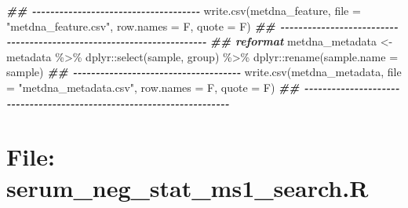 \documentclass[
]{article}
\newenvironment{Shaded}{\begin{snugshade}}{\end{snugshade}}
\newcommand{\AttributeTok}[1]{\textcolor[rgb]{0.77,0.63,0.00}{#1}}
\newcommand{\DocumentationTok}[1]{\textcolor[rgb]{0.56,0.35,0.01}{\textbf{\textit{#1}}}}
\newcommand{\FunctionTok}[1]{\textcolor[rgb]{0.00,0.00,0.00}{#1}}
\newcommand{\NormalTok}[1]{#1}
\newcommand{\OtherTok}[1]{\textcolor[rgb]{0.56,0.35,0.01}{#1}}
\newcommand{\SpecialCharTok}[1]{\textcolor[rgb]{0.00,0.00,0.00}{#1}}
\newcommand{\StringTok}[1]{\textcolor[rgb]{0.31,0.60,0.02}{#1}}
\begin{document}
\begin{Shaded}
\begin{Highlighting}[]
\DocumentationTok{\#\# {-}{-}{-}{-}{-}{-}{-}{-}{-}{-}{-}{-}{-}{-}{-}{-}{-}{-}{-}{-}{-}{-}{-}{-}{-}{-}{-}{-}{-}{-}{-}{-}{-}{-}{-}{-}{-} }
\FunctionTok{write.csv}\NormalTok{(metdna\_feature, }\AttributeTok{file =} \StringTok{"metdna\_feature.csv"}\NormalTok{, }\AttributeTok{row.names =}\NormalTok{ F, }\AttributeTok{quote =}\NormalTok{ F)}
\DocumentationTok{\#\# {-}{-}{-}{-}{-}{-}{-}{-}{-}{-}{-}{-}{-}{-}{-}{-}{-}{-}{-}{-}{-}{-}{-}{-}{-}{-}{-}{-}{-}{-}{-}{-}{-}{-}{-}{-}{-}{-}{-}{-}{-}{-}{-}{-}{-}{-}{-}{-}{-}{-}{-}{-}{-}{-}{-}{-}{-}{-}{-}{-}{-}{-}{-}{-}{-}{-}{-}{-}{-}{-} }
\DocumentationTok{\#\# reformat }
\NormalTok{metdna\_metadata }\OtherTok{\textless{}{-}}\NormalTok{ metadata }\SpecialCharTok{\%\textgreater{}\%} 
\NormalTok{  dplyr}\SpecialCharTok{::}\FunctionTok{select}\NormalTok{(sample, group) }\SpecialCharTok{\%\textgreater{}\%} 
\NormalTok{  dplyr}\SpecialCharTok{::}\FunctionTok{rename}\NormalTok{(}\AttributeTok{sample.name =}\NormalTok{ sample)}
\DocumentationTok{\#\# {-}{-}{-}{-}{-}{-}{-}{-}{-}{-}{-}{-}{-}{-}{-}{-}{-}{-}{-}{-}{-}{-}{-}{-}{-}{-}{-}{-}{-}{-}{-}{-}{-}{-}{-}{-}{-} }
\FunctionTok{write.csv}\NormalTok{(metdna\_metadata, }\AttributeTok{file =} \StringTok{"metdna\_metadata.csv"}\NormalTok{, }\AttributeTok{row.names =}\NormalTok{ F, }\AttributeTok{quote =}\NormalTok{ F)}
\DocumentationTok{\#\# {-}{-}{-}{-}{-}{-}{-}{-}{-}{-}{-}{-}{-}{-}{-}{-}{-}{-}{-}{-}{-}{-}{-}{-}{-}{-}{-}{-}{-}{-}{-}{-}{-}{-}{-}{-}{-}{-}{-}{-}{-}{-}{-}{-}{-}{-}{-}{-}{-}{-}{-}{-}{-}{-}{-}{-}{-}{-}{-}{-}{-}{-}{-}{-}{-}{-}{-}{-}{-}{-} }
\end{Highlighting}
\end{Shaded}

\hypertarget{file-serum_neg_stat_ms1_search.r}{%
\section{File: serum\_neg\_stat\_ms1\_search.R}\label{file-serum_neg_stat_ms1_search.r}}
\end{document}
